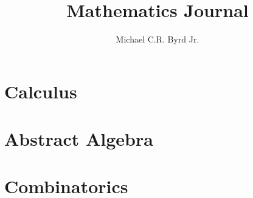 \documentclass[11pt,letterpaper]{tufte-book}
\title{Mathematics Journal}
\author{Michael C.R. Byrd Jr.}
\theoremstyle{plain}
\theoremstyle{remark}
\theoremstyle{definition}
\begin{document}
	
	\maketitle
	
	\tableofcontents	

	
	

	
	\part{Calculus}
	
	
	\part{Abstract Algebra}
	
	
	\part{Combinatorics}
	
		
\end{document}
